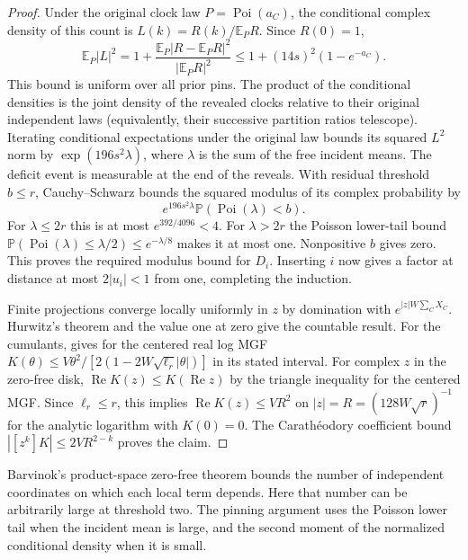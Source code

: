 \documentclass[11pt]{article}
\newcommand{\E}{\mathbb E}
\newcommand{\Prb}{\mathbb P}
\newcommand{\Poi}{\operatorname{Poi}}
\numberwithin{equation}{section}
\begin{document}
\begin{proof}
Under the original clock law $P=\Poi(a_C)$, the conditional complex density
of this count is $L(k)=R(k)/\E_P R$. Since $R(0)=1$,
\[
 \E_P|L|^2=1+\frac{\E_P|R-\E_P R|^2}{|\E_P R|^2}
 \le 1+(14s)^2(1-e^{-a_C}).
\]
This bound is uniform over all prior pins. The product of the conditional
densities is the joint density of the revealed clocks relative to their
original independent laws (equivalently, their successive partition
ratios telescope). Iterating conditional expectations under the original
law bounds its squared $L^2$ norm by $\exp(196s^2\lambda)$, where
$\lambda$ is the sum of the free incident means. The deficit event is
measurable at the end of the reveals. With residual threshold $b\le r$,
Cauchy--Schwarz bounds the squared modulus of its complex probability by
\[
 e^{196s^2\lambda}\Prb(\Poi(\lambda)<b).
\]
For $\lambda\le2r$ this is at most $e^{392/4096}<4$. For $\lambda>2r$
the Poisson lower-tail bound $\Prb(\Poi(\lambda)\le\lambda/2)\le e^{-\lambda/8}$
makes it at most one. Nonpositive $b$ gives zero. This proves the required
modulus bound for $D_i$. Inserting $i$ now gives a factor at distance at most
$2|u_i|<1$ from one, completing the induction.

Finite projections converge locally uniformly in $z$ by domination with
$e^{|z|W\sum_C X_C}$. Hurwitz's theorem and the value one at zero give the
countable result. For the cumulants, \cite[Section~8, actual-variance
threshold concentration]{Q} gives for the centered real log MGF
$K(\theta)\le V\theta^2/[2(1-2W\sqrt{\ell_r}|\theta|)]$ in its stated interval.
For complex $z$ in the zero-free disk, $\operatorname{Re} K(z)\le K(\operatorname{Re}z)$
by the triangle inequality for the centered MGF.
Since $\ell_r\le r$, this implies $\operatorname{Re}K(z)\le VR^2$ on
$|z|=R=(128W\sqrt r)^{-1}$ for the analytic logarithm with $K(0)=0$.
The Carath\'eodory coefficient bound $|[z^k]K|\le2VR^{2-k}$ proves the claim.
\end{proof}
Barvinok's product-space zero-free theorem \cite[Theorem~2.1]{Bar}
bounds the number of independent coordinates on which each local term depends.
Here that number can be arbitrarily large at threshold two. The pinning argument
uses the Poisson lower tail when the incident mean is large, and the second
moment of the normalized conditional density when it is small.
\end{document}
